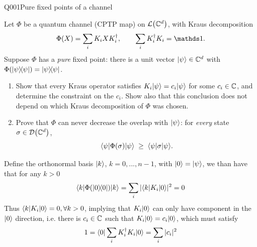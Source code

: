 \begin{entry}{Q001}{Pure fixed points of a channel}


\begin{problem}
Let $\Phi$ be a quantum channel (CPTP map) on $\mathcal{L}\!\left(\mathbb{C}^{d}\right)$, with Kraus decomposition
\[
  \Phi(X)=\sum_{i} K_i X K_i^{\dagger},
  \qquad
  \sum_i K_i^{\dagger} K_i = \id .
\]
Suppose $\Phi$ has a \emph{pure} fixed point: there is a unit vector
$\lvert \psi \rangle\in\mathbb{C}^{d}$ with $\Phi(\lvert \psi \rangle\!\langle \psi \rvert)=\lvert \psi \rangle\!\langle \psi \rvert$.
\begin{enumerate}[label=\textbf{(\alph*)},leftmargin=*]
  \item Show that every Kraus operator satisfies $K_i\lvert \psi \rangle=c_i\lvert \psi \rangle$ for some
        $c_i\in\mathbb{C}$, and determine the constraint on the $c_i$. Show also that this
        conclusion does not depend on which Kraus decomposition of $\Phi$ was chosen.
  \item Prove that $\Phi$ can never decrease the overlap with $\lvert \psi \rangle$: for
        \emph{every} state $\sigma\in\mathcal{D}\!\left(\mathbb{C}^{d}\right)$,
        \[
          \langle \psi \vert \Phi(\sigma) \vert \psi \rangle \;\ge\; \langle \psi \vert \sigma \vert \psi \rangle .
        \]
\end{enumerate}
\end{problem}


\begin{solution}[Part (a)]
Define the orthonormal basis $\lvert k \rangle$, $k=0,...,n-1$, with $\lvert 0 \rangle=\lvert \psi \rangle$, we than have that for any $k>0$ 
\begin{equation}
    \langle k \rvert\Phi(\lvert 0 \rangle\!\langle 0 \rvert)\lvert k \rangle = \sum_i |\langle k \rvert K_i\lvert 0 \rangle|^2 =0
\end{equation}
Thus $\langle k \rvert K_i\lvert 0 \rangle=0, \forall k>0$, implying that $K_i\lvert 0 \rangle$ can only have component in the $\lvert 0 \rangle$ direction, i.e. there is $c_i \in \mathbb{C}$ such that $K_i\lvert 0 \rangle=c_i\lvert 0 \rangle$, which must satisfy
\begin{equation}
    1 = \langle 0 \vert \sum_i K_i^{\dagger} K_i \vert 0 \rangle = \sum_i |c_i|^2
\end{equation}


\end{solution}
\end{entry}
